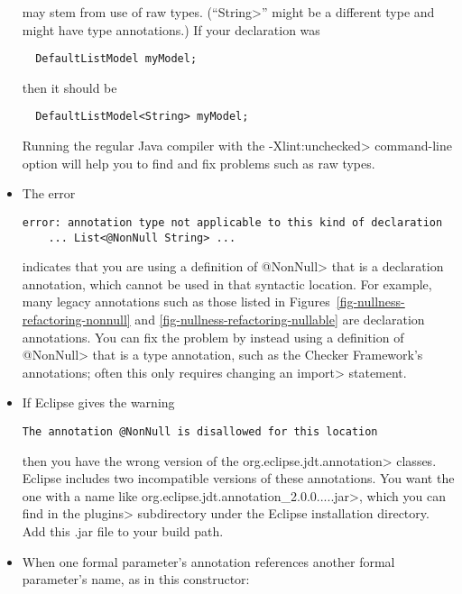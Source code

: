 \begin{itemize}
\noindent
may stem from use of raw types.  (``\<String>'' might be a different type
and might have type annotations.)  If your declaration was

\begin{Verbatim}
  DefaultListModel myModel;
\end{Verbatim}

\noindent
then it should be
\begin{Verbatim}
  DefaultListModel<String> myModel;
\end{Verbatim}

Running the regular Java compiler with the \<-Xlint:unchecked> command-line
option will help you to find and fix problems such as raw types.


\item
The error

\begin{Verbatim}
error: annotation type not applicable to this kind of declaration
    ... List<@NonNull String> ...
\end{Verbatim}

\noindent
indicates that you are using a definition of \<@NonNull> that is a
declaration annotation, which cannot be used in that syntactic location.
For example, many legacy annotations such as those listed in
Figures~\ref{fig-nullness-refactoring-nonnull} and \ref{fig-nullness-refactoring-nullable}
are declaration annotations.  You can
fix the problem by instead using a definition of \<@NonNull> that is a type
annotation, such as the Checker Framework's annotations; often this only
requires changing an \<import> statement.


\item
If Eclipse gives the warning

\begin{Verbatim}
The annotation @NonNull is disallowed for this location
\end{Verbatim}

\noindent
then you have the wrong version of the \<org.eclipse.jdt.annotation>
classes.  Eclipse includes two incompatible versions of these annotations.
You want the one with a name like
\<org.eclipse.jdt.annotation\_2.0.0.....jar>, which you can find in the
\<plugins> subdirectory under the Eclipse installation directory.
Add this .jar file to your build path.


\item
When one formal parameter's annotation references another formal
parameter's name, as in this constructor:


\end{itemize}
